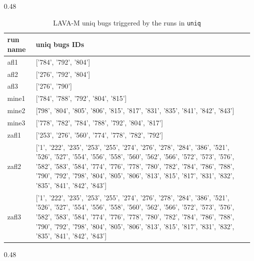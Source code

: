     \begin{table}[htbp]
        \centering
        \begin{subtable}[t]{0.48\textwidth}
            \centering
            \caption{LAVA-M uniq bugs triggered by the runs in \textmd{\texttt{base64}}}
            \label{tab:uniq_base64}
            \begin{tabularx}{\linewidth}{|>{\raggedright\arraybackslash}p{1.5cm}|X|}
                \hline
                run name & uniq bugs IDs \\
                \hline
                afl1 & ['784', '792', '804']\\
                \hline
                afl2 & ['276', '792', '804']\\
                \hline
                afl3 & ['276', '790']\\
                \hline
                mine1 & ['784', '788', '792', '804', '815']\\
                \hline
                mine2 & [798', '804', '805', '806', '815', '817', '831', '835', '841', '842', '843']\\
                \hline
                mine3 & ['778', '782', '784', '788', '792', '804', '817']\\
                \hline
                zafl1 & ['253', '276', '560', '774', '778', '782', '792']\\
                \hline
                zafl2 & ['1', '222', '235', '253', '255', '274', '276', '278', '284', '386', '521', '526', '527', '554', '556', '558', '560', '562', '566', '572', '573', '576', '582', '583', '584', '774', '776', '778', '780', '782', '784', '786', '788', '790', '792', '798', '804', '805', '806', '813', '815', '817', '831', '832', '835', '841', '842', '843']\\
                \hline
                zafl3 & ['1', '222', '235', '253', '255', '274', '276', '278', '284', '386', '521', '526', '527', '554', '556', '558', '560', '562', '566', '572', '573', '576', '582', '583', '584', '774', '776', '778', '780', '782', '784', '786', '788', '790', '792', '798', '804', '805', '806', '813', '815', '817', '831', '832', '835', '841', '842', '843']\\
                \hline
            \end{tabularx}
        \end{subtable}
        \hfill
        \begin{subtable}[t]{0.48\textwidth}
            \centering
            \caption{LAVA-M uniq bugs triggered by the runs in \textmd{\texttt{uniq}}}

\end{subtable}
\end{table}
